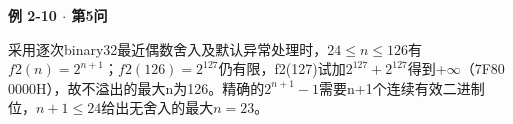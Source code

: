 {\color{ink}\bfseries 例 2-10 \(\cdot \) 第5问}\par\vspace{1bp}采用逐次binary32最近偶数舍入及默认异常处理时，\(24\le n\le 126\)有\(f2(n)=\allowbreak{}2^{n+\allowbreak{}1}\)；\(f2(126)=\allowbreak{}2^{127}\)仍有限，f2(127)试加\(2^{127}+\allowbreak{}2^{127}\)得到+\allowbreak{}\(\infty \)（7F80 0000H），故不溢出的最大n为126。精确的\(2^{n+\allowbreak{}1}-1\)需要n+\allowbreak{}1个连续有效二进制位，\(n+\allowbreak{}1\le 24\)给出无舍入的最大\(n=\allowbreak{}23\)。
